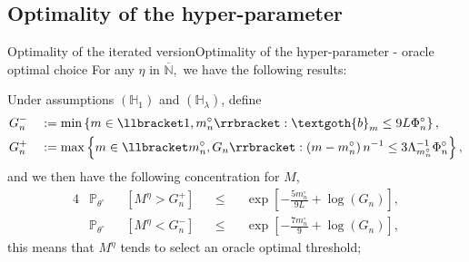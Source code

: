 \documentclass[10pt]{beamer}
\begin{document}
\subsection{Optimality of the hyper-parameter}
\begin{frame}{Optimality of the iterated version}{Optimality of the hyper-parameter - oracle optimal choice}
For any $\eta$ in $\overline{\mathbb{N}},$ we have the following results:

\medskip

Under assumptions $\left(\mathbb{H}_{1}\right)$ and $\left(\mathbb{H}_{\lambda}\right)$, define
\begin{alignat*}{2}
&G_{n}^{-} &&:= \min\left\{m \in \llbracket 1, m_{n}^{\circ} \rrbracket : \textgoth{b}_{m} \leq 9 L \Phi_{n}^{\circ}\right\},\\
&G_{n}^{+} &&:= \max \left\{m \in \llbracket m_{n}^{\circ}, G_{n} \rrbracket : \left( m - m_{n}^{\circ} \right) n^{-1} \leq 3 \Lambda_{m_{n}^{\circ}}^{-1} \Phi_{n}^{\circ}\right\},
\end{alignat*}
and we then have the following concentration for $M$,
\begin{alignat*}{4}
&\mathbb{P}_{\theta^{\circ}}&&\left[M^{\eta} > G_{n}^{+}\right] &&\leq&& \exp\left[- \frac{5 m_{n}^{\circ}}{9 L} + \log \left(G_{n}\right)\right],\\
&\mathbb{P}_{\theta^{\circ}}&&\left[M^{\eta} < G_{n}^{-}\right] &&\leq&& \exp\left[- \frac{7 m_{n}^{\circ}}{9} + \log \left(G_{n}\right)\right],
\end{alignat*}
\textcolor{red!90!black}{this means that $M^{\eta}$ tends to select an oracle optimal threshold};


\end{frame}
\end{document}
